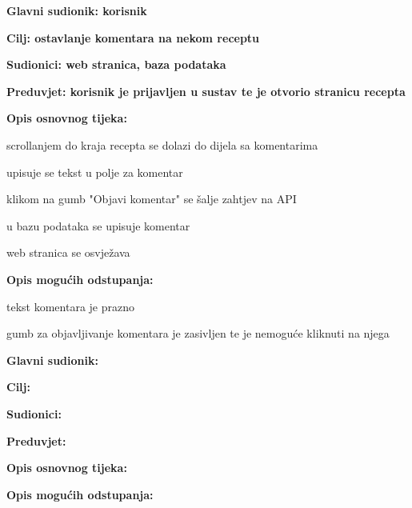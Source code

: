 					\noindent {}
					\begin{packed_item}
						\item \textbf{Glavni sudionik: korisnik}
						\item  \textbf{Cilj: ostavlanje komentara na nekom receptu}
						\item  \textbf{Sudionici: web stranica, baza podataka}
						\item  \textbf{Preduvjet: korisnik je prijavljen u sustav te je otvorio stranicu recepta}
						
						\item  \textbf{Opis osnovnog tijeka:}
						\item[] \begin{packed_enum}
							\item scrollanjem do kraja recepta se dolazi do dijela sa komentarima
							\item upisuje se tekst u polje za komentar
							\item klikom na gumb "Objavi komentar" se šalje zahtjev na API
							\item u bazu podataka se upisuje komentar
							\item web stranica se osvježava
						\end{packed_enum}
						
						\item  \textbf{Opis mogućih odstupanja:}
						\item[] \begin{packed_item}
							\item[12.a] tekst komentara je prazno
							\begin{packed_enum}
								\item gumb za objavljivanje komentara je zasivljen te je nemoguće kliknuti na njega
							\end{packed_enum}
						\end{packed_item}
					\end{packed_item}
				
				
				
					\noindent \underbar{\textbf{UC}}
					\begin{packed_item}
						\item \textbf{Glavni sudionik: }
						\item  \textbf{Cilj:}
						\item  \textbf{Sudionici:}
						\item  \textbf{Preduvjet:}
						
						\item  \textbf{Opis osnovnog tijeka:}
						\item[] \begin{packed_enum}
						\end{packed_enum}
						
						\item  \textbf{Opis mogućih odstupanja:}
						\item[] \begin{packed_item}							
						\end{packed_item}
					\end{packed_item}
					
